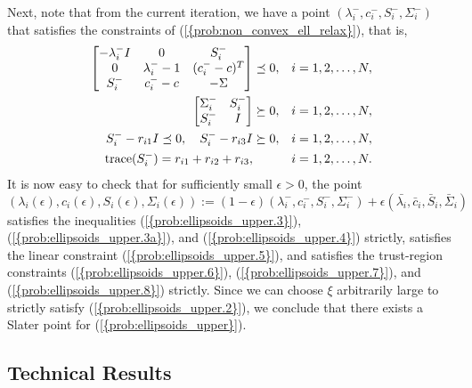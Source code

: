 \documentclass{siamltex}
\begin{document}
Next, note that from the current iteration, we have a point
$(\lambda_i^-,c_i^-,S_i^-,\Sigma_i^-)$ that satisfies the constraints of
{(\ref{{prob:non_convex_ell_relax}})}, that is,
\begin{subequations}
\label{prob:previt}
\begin{align}
\label{prob:previt.2} 
\left[ \begin{matrix} - \lambda_i^- I &0&S_i^-\\
0& \lambda_i^--1&(c_i^--c)^T\\ 
S_i^- &c_i^--c&-\Sigma \end{matrix} \right] &\preceq 0, && i=1,2,\dotsc,N, \\
\label{prob:previt.2a}
\left[ \begin{matrix} \Sigma_i^- & S_i^- \\ S_i^- & I \end{matrix} \right] &\succeq 0, 
&& i=1,2,\dotsc,N, \\
\label{prob:previt.3}
S_i^--r_{i1} I\preceq 0, \quad S_i^--r_{i3} I&\succeq 0,  && i=1,2,\dots,N, \\
\label{prob:previt.4}
{\mbox{\rm trace}}(S_i^-)=r_{i1}+r_{i2}+r_{i3},& && i=1,2,\dots,N.
\end{align}
\end{subequations}
It is now easy to check that for sufficiently small $\epsilon>0$, the point
\[
(\lambda_i(\epsilon),c_i(\epsilon), S_i(\epsilon),\Sigma_i(\epsilon)) :=
(1-\epsilon)   (\lambda_i^-,c_i^-,S_i^-,\Sigma_i^-) +
\epsilon  (\bar{\lambda_i},\bar{c}_i, \bar{S}_i, \bar{\Sigma}_i)
\]
satisfies the inequalities {(\ref{{prob:ellipsoids_upper.3}})},
{(\ref{{prob:ellipsoids_upper.3a}})}, and {(\ref{{prob:ellipsoids_upper.4}})}
strictly, satisfies the linear constraint
{(\ref{{prob:ellipsoids_upper.5}})}, and satisfies the trust-region
constraints {(\ref{{prob:ellipsoids_upper.6}})},
{(\ref{{prob:ellipsoids_upper.7}})}, and {(\ref{{prob:ellipsoids_upper.8}})}
strictly. Since we can choose $\xi$ arbitrarily large to strictly
satisfy {(\ref{{prob:ellipsoids_upper.2}})}, we conclude that there exists
a Slater point for {(\ref{{prob:ellipsoids_upper}})}.

\subsection{Technical Results} \label{sec:tech}
\end{document}

